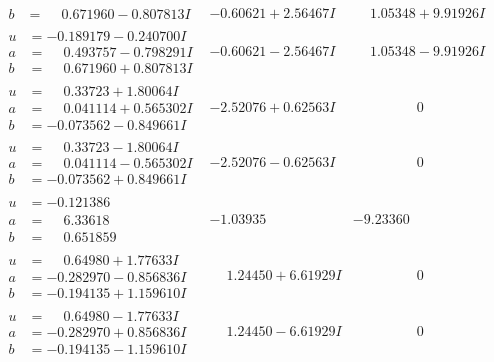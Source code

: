 \documentclass[1p]{elsarticle_modified}
\theoremstyle{definition}
\begin{document}
$$\begin{array}{c|c|c}
\begin{aligned}
b &= \phantom{-}0.671960 - 0.807813 I\end{aligned}
 & -0.60621 + 2.56467 I & \phantom{-}1.05348 + 9.91926 I \\ \hline\begin{aligned}
u &= -0.189179 - 0.240700 I \\
a &= \phantom{-}0.493757 - 0.798291 I \\
b &= \phantom{-}0.671960 + 0.807813 I\end{aligned}
 & -0.60621 - 2.56467 I & \phantom{-}1.05348 - 9.91926 I \\ \hline\begin{aligned}
u &= \phantom{-}0.33723 + 1.80064 I \\
a &= \phantom{-}0.041114 + 0.565302 I \\
b &= -0.073562 - 0.849661 I\end{aligned}
 & -2.52076 + 0.62563 I & \phantom{-0.000000 } 0 \\ \hline\begin{aligned}
u &= \phantom{-}0.33723 - 1.80064 I \\
a &= \phantom{-}0.041114 - 0.565302 I \\
b &= -0.073562 + 0.849661 I\end{aligned}
 & -2.52076 - 0.62563 I & \phantom{-0.000000 } 0 \\ \hline\begin{aligned}
u &= -0.121386\phantom{ +0.000000I} \\
a &= \phantom{-}6.33618\phantom{ +0.000000I} \\
b &= \phantom{-}0.651859\phantom{ +0.000000I}\end{aligned}
 & -1.03935\phantom{ +0.000000I} & -9.23360\phantom{ +0.000000I} \\ \hline\begin{aligned}
u &= \phantom{-}0.64980 + 1.77633 I \\
a &= -0.282970 - 0.856836 I \\
b &= -0.194135 + 1.159610 I\end{aligned}
 & \phantom{-}1.24450 + 6.61929 I & \phantom{-0.000000 } 0 \\ \hline\begin{aligned}
u &= \phantom{-}0.64980 - 1.77633 I \\
a &= -0.282970 + 0.856836 I \\
b &= -0.194135 - 1.159610 I\end{aligned}
 & \phantom{-}1.24450 - 6.61929 I & \phantom{-0.000000 } 0 \\ \hline\begin{aligned}

\end{aligned}
\end{array}$$
\end{document}
